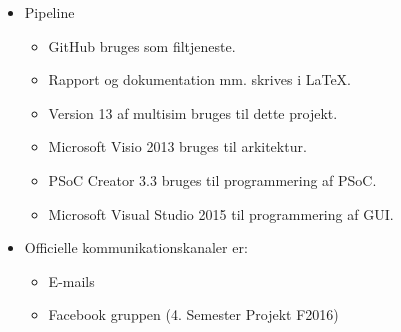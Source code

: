 \begin{itemize}
		\item Pipeline
			\begin{itemize}
				\item GitHub bruges som filtjeneste.
				\item Rapport og dokumentation mm. skrives i LaTeX.
				\item Version 13 af multisim bruges til dette projekt.
				\item Microsoft Visio 2013 bruges til arkitektur.
				\item PSoC Creator 3.3 bruges til programmering af PSoC.
				\item Microsoft Visual Studio 2015 til programmering af GUI.\\
			\end{itemize}
		\item Officielle kommunikationskanaler er:
		\begin{itemize}
			\item	E-mails
			\item 	Facebook gruppen (4. Semester Projekt F2016)
		\end{itemize}
	\end{itemize}


